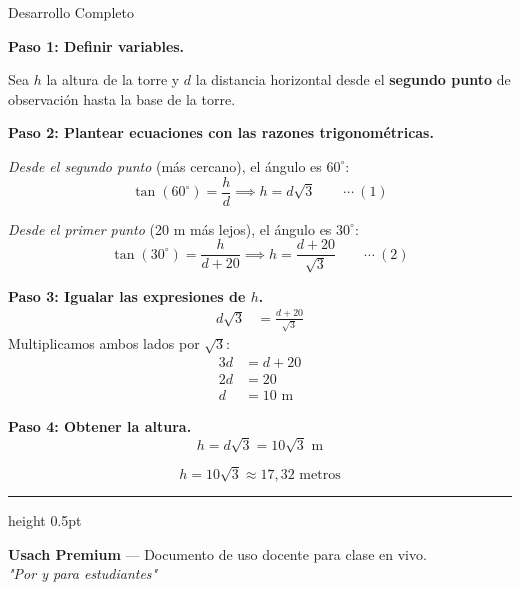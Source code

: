 \documentclass[letterpaper, 12pt]{article}
\newcommand{\fraseportada}{"Por y para estudiantes"}
\begin{document}
\begin{solucionbox}{Desarrollo Completo}

\textbf{Paso 1: Definir variables.}

Sea $h$ la altura de la torre y $d$ la distancia horizontal desde el \textbf{segundo punto} de observación hasta la base de la torre.

\textbf{Paso 2: Plantear ecuaciones con las razones trigonométricas.}

\textit{Desde el segundo punto} (más cercano), el ángulo es $60^\circ$:
\[
    \tan(60^\circ) = \frac{h}{d} \implies h = d\sqrt{3} \qquad \cdots\ (1)
\]

\textit{Desde el primer punto} (20 m más lejos), el ángulo es $30^\circ$:
\[
    \tan(30^\circ) = \frac{h}{d + 20} \implies h = \frac{d + 20}{\sqrt{3}} \qquad \cdots\ (2)
\]

\textbf{Paso 3: Igualar las expresiones de $h$.}
\begin{align*}
    d\sqrt{3} &= \frac{d + 20}{\sqrt{3}}
\end{align*}
Multiplicamos ambos lados por $\sqrt{3}$:
\begin{align*}
    3d &= d + 20 \\
    2d &= 20 \\
    d &= 10 \text{ m}
\end{align*}

\textbf{Paso 4: Obtener la altura.}
\[
    h = d\sqrt{3} = 10\sqrt{3} \text{ m}
\]

\[\boxed{h = 10\sqrt{3} \approx 17{,}32 \text{ metros}}\]
\end{solucionbox}

\vspace{1.5cm}

\begin{center}
    {\color{azulFuerte}\hrule height 0.5pt}
    \vspace{0.5cm}
    \small\textbf{Usach Premium} — Documento de uso docente para clase en vivo. \\[0.2cm]
    \textit{\fraseportada}
\end{center}
\end{document}
